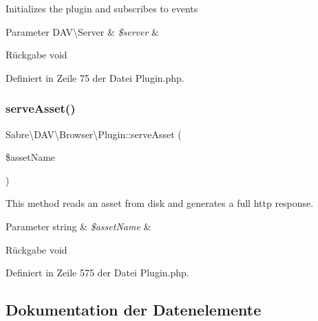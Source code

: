 Initializes the plugin and subscribes to events


\begin{DoxyParams}[1]{Parameter}
D\+A\+V\textbackslash{}\+Server & {\em \$server} & \\
\hline
\end{DoxyParams}
\begin{DoxyReturn}{Rückgabe}
void 
\end{DoxyReturn}


Definiert in Zeile 75 der Datei Plugin.\+php.

\mbox{\label{class_sabre_1_1_d_a_v_1_1_browser_1_1_plugin_a58aabbc6d9655d9ea0a4ef348e1ae6d1}} 
\subsubsection{\texorpdfstring{serve\+Asset()}{serveAsset()}}
{\footnotesize\ttfamily Sabre\textbackslash{}\+D\+A\+V\textbackslash{}\+Browser\textbackslash{}\+Plugin\+::serve\+Asset (\begin{DoxyParamCaption}\item[{}]{\$asset\+Name }\end{DoxyParamCaption})\hspace{0.3cm}{\ttfamily [protected]}}

This method reads an asset from disk and generates a full http response.


\begin{DoxyParams}[1]{Parameter}
string & {\em \$asset\+Name} & \\
\hline
\end{DoxyParams}
\begin{DoxyReturn}{Rückgabe}
void 
\end{DoxyReturn}


Definiert in Zeile 575 der Datei Plugin.\+php.



\subsection{Dokumentation der Datenelemente}
\mbox{\label{class_sabre_1_1_d_a_v_1_1_browser_1_1_plugin_a613d0a2df9de304064928b5679f9ae50}} 
